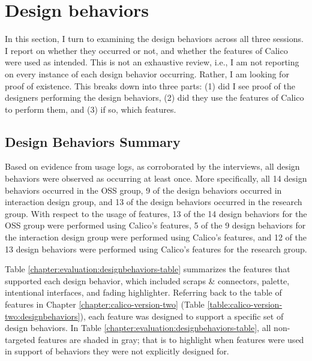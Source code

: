 \documentclass[12pt,fleqn]{ucithesis}
\begin{document}

\section{Design behaviors}
\label{chapter:evaluation:design-behaviors}
In this section, I turn to examining the design behaviors across all three sessions. I report on whether they occurred or not, and whether the features of Calico were used as intended. This is not an exhaustive review, i.e., I am not reporting on every instance of each design behavior occurring. Rather, I am looking for proof of existence. This breaks down into three parts: (1) did I see proof of the designers performing the design behaviors, (2) did they use the features of Calico to perform them, and (3) if so, which features.


\subsection{Design Behaviors Summary}

Based on evidence from usage logs, as corroborated by the interviews, all design behaviors were observed as occurring at least once. More specifically, all 14 design behaviors occurred in the OSS group, 9 of the design behaviors occurred in interaction design group, and 13 of the design behaviors occurred in the research group. With respect to the usage of features, 13 of the 14 design behaviors for the OSS group were performed using Calico's features, 5 of the 9 design behaviors for the interaction design group were performed using Calico's features, and 12 of the 13 design behaviors were performed using Calico's features for the research group.

Table \ref{chapter:evaluation:designbehaviors-table} summarizes the features that supported each design behavior, which included scraps \& connectors, palette, intentional interfaces, and fading highlighter. Referring back to the table of features in Chapter \ref{chapter:calico-version-two} (Table \ref{table:calico-version-two:designbehaviors}), each feature was designed to support a specific set of design behaviors. In Table \ref{chapter:evaluation:designbehaviors-table}, all non-targeted features are shaded in gray; that is to highlight when features were used in support of behaviors they were not explicitly designed for.
\end{document}
